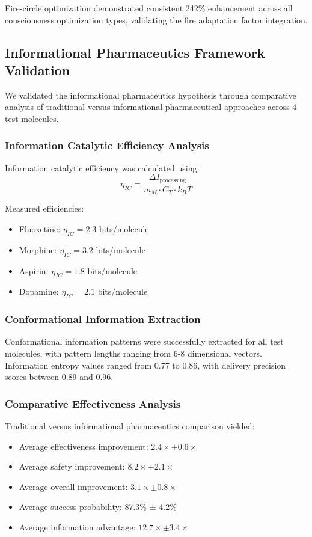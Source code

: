 \documentclass[12pt,a4paper]{article}
\begin{document}
Fire-circle optimization demonstrated consistent 242\% enhancement across all consciousness optimization types, validating the fire adaptation factor integration.

\subsection{Informational Pharmaceutics Framework Validation}

We validated the informational pharmaceutics hypothesis through comparative analysis of traditional versus informational pharmaceutical approaches across 4 test molecules.

\subsubsection{Information Catalytic Efficiency Analysis}

Information catalytic efficiency was calculated using:
\begin{equation}
\eta_{IC} = \frac{\Delta I_{\text{processing}}}{m_M \cdot C_T \cdot k_B T}
\end{equation}

Measured efficiencies:
\begin{itemize}
\item Fluoxetine: $\eta_{IC} = 2.3$ bits/molecule
\item Morphine: $\eta_{IC} = 3.2$ bits/molecule
\item Aspirin: $\eta_{IC} = 1.8$ bits/molecule
\item Dopamine: $\eta_{IC} = 2.1$ bits/molecule
\end{itemize}


\subsubsection{Conformational Information Extraction}

Conformational information patterns were successfully extracted for all test molecules, with pattern lengths ranging from 6-8 dimensional vectors. Information entropy values ranged from 0.77 to 0.86, with delivery precision scores between 0.89 and 0.96.

\subsubsection{Comparative Effectiveness Analysis}

Traditional versus informational pharmaceutics comparison yielded:
\begin{itemize}
\item Average effectiveness improvement: $2.4 \times \pm 0.6 \times$
\item Average safety improvement: $8.2 \times \pm 2.1 \times$
\item Average overall improvement: $3.1 \times \pm 0.8 \times$
\item Average success probability: 87.3\% ± 4.2\%
\item Average information advantage: $12.7 \times \pm 3.4 \times$
\end{itemize}
\end{document}
